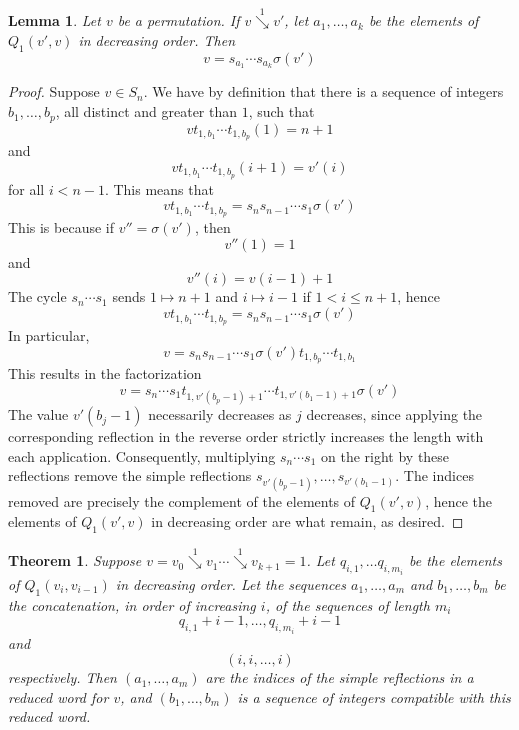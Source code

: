 \documentclass[reqno]{amsart}
\newtheorem{lemma}{Lemma}[subsection]
\newtheorem{theorem}{Theorem}[section]
\theoremstyle{definition}
\theoremstyle{remark}
\numberwithin{equation}{subsection}
\newcommand{\downvar}[1]{\stackrel{#1}{\searrow}}
\begin{document}
\begin{lemma}\label{lemma:factor}
Let $v$ be a permutation. If $v\downvar{1} v'$, let $a_1,\ldots, a_k$ be the elements of $Q_1(v',v)$ in decreasing order. Then
$$v=s_{a_1}\cdots s_{a_k}\sigma(v')$$
\end{lemma}
\begin{proof}
	Suppose $v\in S_{n}$. We have by definition that there is a sequence of integers $b_1,\ldots,b_p$, all distinct and greater than $1$, such that
	$$vt_{1,b_1}\cdots t_{1, b_p}(1) = n + 1$$
	and
	$$vt_{1,b_1}\cdots t_{1, b_p}(i+1) = v'(i)$$
	for all $i<n-1$. This means that
	$$vt_{1,b_1}\cdots t_{1, b_p} = s_ns_{n-1}\cdots s_1\sigma(v')$$
	This is because if $v''=\sigma(v')$, then
	$$v''(1)=1$$
	and
	$$v''(i) = v(i-1)+1$$
	The cycle $s_n\cdots s_1$ sends $1\mapsto n+1$ and $i\mapsto i-1$ if $1<i\leq n+1$, hence
	$$vt_{1,b_1}\cdots t_{1, b_p} = s_ns_{n-1}\cdots s_1\sigma(v')$$
	In particular,
	$$v = s_ns_{n-1}\cdots s_1\sigma(v')t_{1,b_p}\cdots t_{1, b_1}$$
	This results in the factorization
	$$v = s_n\cdots s_1t_{1,v'(b_p-1)+1}\cdots t_{1,v'(b_1-1)+1}\sigma(v')$$
	The value $v'(b_j-1)$ necessarily decreases as $j$ decreases, since applying the corresponding reflection in the reverse order strictly increases the length with each application.  Consequently, multiplying $s_n\cdots s_1$ on the right by these reflections remove the simple reflections $s_{v'(b_p-1)},\ldots, s_{v'(b_1-1)}$. The indices removed are precisely the complement of the elements of $Q_1(v',v)$, hence the elements of $Q_1(v',v)$ in decreasing order are what remain, as desired.
\end{proof}

\begin{theorem} \label{theorem:sequencecompat}
	Suppose $v=v_0\downvar{1} v_1\cdots \downvar{1} v_{k+1}=1$. Let $q_{i,1},\ldots q_{i,m_i}$ be the elements of $Q_1(v_i,v_{i-1})$ in decreasing order. Let the sequences $a_1,\ldots,a_m$ and $b_1,\ldots,b_m$ be the concatenation, in order of increasing $i$, of the sequences of length $m_i$
	$$q_{i,1} + i -1,\ldots, q_{i,m_i} + i - 1$$
	and
	$$(i, i,\ldots, i)$$
	respectively. Then $(a_1,\ldots,a_m)$ are the indices of the simple reflections in a reduced word for $v$, and $(b_1,\ldots,b_m)$ is a sequence of integers compatible with this reduced word.
\end{theorem}

\end{document}
